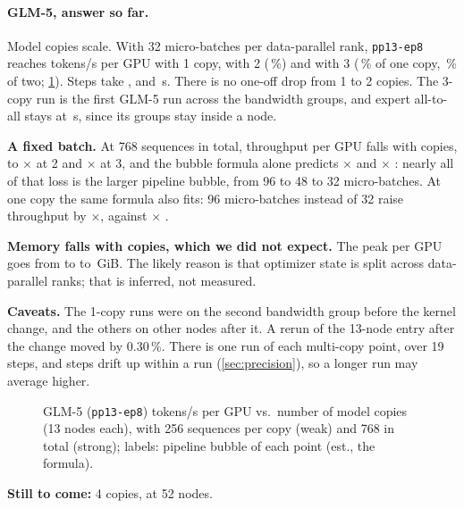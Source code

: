\paragraph{GLM-5, answer so far.} Model copies scale. With 32 micro-batches per data-parallel rank, \texttt{pp13-ep8} reaches \TriGlmThirteenTok{} tokens/s per GPU with 1 copy, \TriGlmWeakTwoTok{} with 2 (\TriGlmCopiesEffTwo\,\%) and \TriGlmWeakThreeTok{} with 3 (\TriGlmCopiesEff\,\% of one copy, \TriGlmCopiesEffFromTwo\,\% of two; \cref{fig:glm_scaling}). Steps take \TriGlmThirteenStep, \TriGlmWeakTwoStep{} and \TriGlmWeakThreeStep\,s. There is no one-off drop from 1 to 2 copies. The 3-copy run is the first GLM-5 run across the bandwidth groups, and expert all-to-all stays at \TriGlmWeakThreeAtoa\,s, since its groups stay inside a node.

\textbf{A fixed batch.} At 768 sequences in total, throughput per GPU falls with copies, to $\times$\TriGlmStrongTwoRatio{} at 2 and $\times$\TriGlmStrongThreeRatio{} at 3, and the bubble formula alone predicts $\times$\TriGlmStrongTwoFormula{} and $\times$\TriGlmStrongThreeFormula{} \est{}: nearly all of that loss is the larger pipeline bubble, from 96 to 48 to 32 micro-batches. At one copy the same formula also fits: 96 micro-batches instead of 32 raise throughput by $\times$\TriGlmStrongRatio{}, against $\times$\TriGlmStrongFormula{} \est{}.

\textbf{Memory falls with copies, which we did not expect.} The peak per GPU goes from \TriGlmThirteenMem{} to \TriGlmWeakTwoMem{} to \TriGlmWeakThreeMem\,GiB. The likely reason is that optimizer state is split across data-parallel ranks; that is inferred, not measured.

\textbf{Caveats.} The 1-copy runs were on the second bandwidth group before the kernel change, and the others on other nodes after it. A rerun of the 13-node entry after the change moved by 0.30\,\%. There is one run of each multi-copy point, over 19 steps, and steps drift up within a run (\cref{sec:precision}), so a longer run may average higher.

\begin{figure}[h]
  \centering{}
  \caption{GLM-5 (\texttt{pp13-ep8}) tokens/s per GPU vs.\ number of model copies (13 nodes each), with 256 sequences per copy (weak) and 768 in total (strong); labels: pipeline bubble of each point (est., the formula). }
  \label{fig:glm_scaling}
\end{figure}

\textbf{Still to come:} 4 copies, at 52 nodes.
